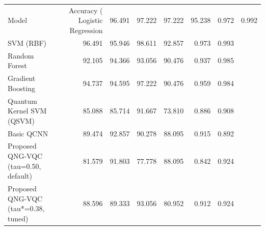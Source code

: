 \begin{tabular}{lrrrrrr}
\toprule
Model & Accuracy (%
\midrule
Logistic Regression & 96.491 & 97.222 & 97.222 & 95.238 & 0.972 & 0.992 \\
SVM (RBF) & 96.491 & 95.946 & 98.611 & 92.857 & 0.973 & 0.993 \\
Random Forest & 92.105 & 94.366 & 93.056 & 90.476 & 0.937 & 0.985 \\
Gradient Boosting & 94.737 & 94.595 & 97.222 & 90.476 & 0.959 & 0.984 \\
Quantum Kernel SVM (QSVM) & 85.088 & 85.714 & 91.667 & 73.810 & 0.886 & 0.908 \\
Basic QCNN & 89.474 & 92.857 & 90.278 & 88.095 & 0.915 & 0.892 \\
Proposed QNG-VQC (tau=0.50, default) & 81.579 & 91.803 & 77.778 & 88.095 & 0.842 & 0.924 \\
Proposed QNG-VQC (tau*=0.38, tuned) & 88.596 & 89.333 & 93.056 & 80.952 & 0.912 & 0.924 \\
\bottomrule
\end{tabular}
